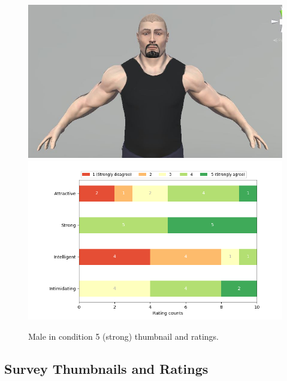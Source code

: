 \begin{figure}[H]
  \includegraphics[width=\linewidth]{Images/Males/2.JPG}
\endminipage\hfill
{}
  \includegraphics[width=\linewidth]{Survey/avatar_m_experiment5.png}
\endminipage\hfill
\caption{Male in condition 5 (strong) thumbnail and ratings.}
\end{figure}

\subsection{Survey Thumbnails and Ratings}
\label{subsection:thumbnails}
